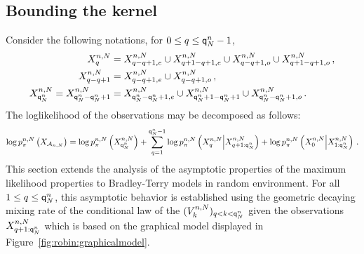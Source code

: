 \subsection{Bounding the kernel}
Consider the following notations, for $0\le q \le {\mathsf{q}}^{n}_{N}-1$,
\begin{align*}
X_{q}^{n,N}                   & = X_{q- q+1,e}^{n,N}\cup X_{q+1-q+1,e}^{n,N}\cup X_{q-q+1,o}^{n,N}\cup X_{q+1 - q+1,o}^{n,N}\,,\\
X^{n,N}_{q- q+1} &= X^{n,N}_{q- q+1,e}\cup X^{n,N}_{q- q+1,o}\,,\\
X_{{\mathsf{q}}^{n}_{N}}^{n,N} = X_{{\mathsf{q}}^{n}_{N}-{\mathsf{q}}^{n}_{N}+1}^{n,N} & = X_{{\mathsf{q}}^{n}_{N} - {\mathsf{q}}^{n}_{N} +1,e}^{n,N}\cup X_{{\mathsf{q}}^{n}_{N}+1-{\mathsf{q}}^{n}_{N}+1}^{n,N}\cup X_{{\mathsf{q}}^{n}_{N}-{\mathsf{q}}^{n}_{N}+1,o}^{n,N}\,.
\end{align*}
The loglikelihood of the observations may be decomposed as follows:
\[
\log p_{\pi}^{n,N}\left(X_{\mathcal{A}_{n,N}}\right) = \log p_{\pi}^{n,N}\left(X_{{\mathsf{q}}^{n}_{N}}^{n,N}\right) + \sum_{q=1}^{{\mathsf{q}}^{n}_{N}-1}  \log p_{\pi}^{n,N}\left(X_{q}^{n,N}\middle|X_{q+1:{\mathsf{q}}^{n}_{N}}^{n,N}\right) +  \log p_{\pi}^{n,N}\left(X_{0}^{n,N}\middle|X_{1:{\mathsf{q}}^{n}_{N}}^{n,N}\right)\,.
\]
This section extends the analysis of the asymptotic properties of the maximum likelihood properties to Bradley-Terry models in random environment. For all $1\le q \le {\mathsf{q}}^{n}_{N}$, this asymptotic behavior is established using the geometric decaying mixing rate of the conditional law of the $(V^{n,N}_{k})_{q< k < {\mathsf{q}}^{n}_{N}}$ given the observations $X^{n,N}_{q+1:{\mathsf{q}}^{n}_{N}}$ which is based on the graphical model displayed in Figure~\ref{fig:robin:graphicalmodel}.
